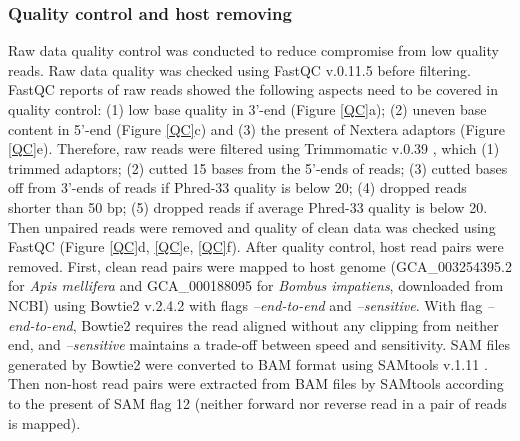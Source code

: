 \documentclass[11pt]{article}
\begin{document}
    \subsubsection{Quality control and host removing}
    \label{HostRemove}
    Raw data quality control was conducted to reduce compromise from low quality reads.
    Raw data quality was checked using FastQC v.0.11.5 \citep{andrews2010fastqc} before filtering. 
    FastQC reports of raw reads showed the following aspects need to be covered in quality control: (1) low base quality in 3'-end (Figure \ref{QC}a); (2) uneven base content in 5'-end (Figure \ref{QC}c) and (3) the present of Nextera adaptors (Figure \ref{QC}e). 
    Therefore, raw reads were filtered using Trimmomatic v.0.39 \citep{bolger2014trimmomatic}, which (1) trimmed adaptors; (2) cutted 15 bases from the 5'-ends of reads; (3) cutted bases off from 3'-ends of reads if Phred-33 quality is below 20; (4) dropped reads shorter than 50 bp; (5) dropped reads if average Phred-33 quality is below 20. 
    Then unpaired reads were removed and quality of clean data was checked using FastQC (Figure \ref{QC}d, \ref{QC}e, \ref{QC}f).
    \newline  
    After quality control, host read pairs were removed. 
    First, clean read pairs were mapped to host genome (GCA\_003254395.2 for \textit{Apis mellifera} and GCA\_000188095 for \textit{Bombus impatiens}, downloaded from NCBI) using Bowtie2 v.2.4.2 \citep{langmead2012fast} with flags \textit{--end-to-end} and \textit{--sensitive}. 
    With flag \textit{--end-to-end}, Bowtie2 requires the read aligned without any clipping from neither end, and \textit{--sensitive} maintains a trade-off between speed and sensitivity. 
    SAM files generated by Bowtie2 were converted to BAM format using SAMtools v.1.11 \citep{li2009sequence}. 
    Then non-host read pairs were extracted from BAM files by SAMtools according to the present of SAM flag 12 (neither forward nor reverse read in a pair of reads is mapped).
\end{document}
